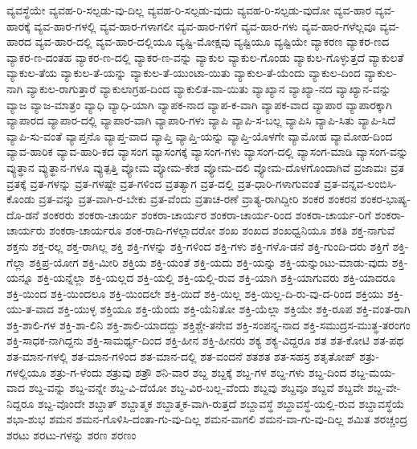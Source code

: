 {ವ್ಯವಸ್ಥೆಯೇ
ವ್ಯವಹ-ರಿ-ಸಲ್ಪಡು-ವು-ದಿಲ್ಲ
ವ್ಯವಹ-ರಿ-ಸಲ್ಪಡು-ವುದು
ವ್ಯವಹ-ರಿ-ಸಲ್ಪಡು-ವುದೋ
ವ್ಯವ-ಹಾರ
ವ್ಯವ-ಹಾರಕ್ಕೆ
ವ್ಯವ-ಹಾರ-ಗಳಲ್ಲಿ
ವ್ಯವ-ಹಾರ-ಗಳಾಗಲೀ
ವ್ಯವ-ಹಾರ-ಗಳಿಗೆ
ವ್ಯವ-ಹಾರ-ಗಳು
ವ್ಯವ-ಹಾರ-ಗಳೆಲ್ಲವೂ
ವ್ಯವ-ಹಾರದ
ವ್ಯವ-ಹಾರ-ದಲ್ಲಿ
ವ್ಯವ-ಹಾರ-ದಲ್ಲಿಯೂ
ವ್ಯಷ್ಟಿ-ಮೋಕ್ಷವು
ವ್ಯಷ್ಟಿಯೂ
ವ್ಯಷ್ಟಿಯೇ
ವ್ಯಾಕರಣ
ವ್ಯಾಕರ-ಣದ
ವ್ಯಾಕರ-ಣ-ದಂತಹ
ವ್ಯಾಕರ-ಣ-ದಲ್ಲಿ
ವ್ಯಾಕರ-ಣ-ವನ್ನು
ವ್ಯಾಕುಲ
ವ್ಯಾಕುಲ-ಗೊಂಡು
ವ್ಯಾಕುಲ-ಗೊಳ್ಳುತ್ತದೆ
ವ್ಯಾಕುಲತೆ
ವ್ಯಾಕುಲ-ತೆಯ
ವ್ಯಾಕುಲ-ತೆ-ಯನ್ನು
ವ್ಯಾಕುಲ-ತೆ-ಯುಂಟಾ-ಯಿತು
ವ್ಯಾಕುಲ-ತೆ-ಯೆಂದು
ವ್ಯಾಕುಲ-ದಿಂದ
ವ್ಯಾಕುಲ-ನಾಗಿ
ವ್ಯಾಕುಲ-ರಾಗುತ್ತಾರೆ
ವ್ಯಾಕುಲಾಗ್ರಹ-ದಿಂದ
ವ್ಯಾಕುಲಿತ-ವಾ-ಯಿತು
ವ್ಯಾಖ್ಯಾನ
ವ್ಯಾಖ್ಯಾ-ನದ
ವ್ಯಾಖ್ಯಾನ-ವನ್ನು
ವ್ಯಾಜ
ವ್ಯಾಜ-ಮಾತ್ರಂ
ವ್ಯಾಧಿ
ವ್ಯಾಧಿ-ಯಾಗಿ
ವ್ಯಾಪಕ-ನಾದ
ವ್ಯಾಪ-ಕ-ವಾಗಿ
ವ್ಯಾಪಕ-ವಾದ
ವ್ಯಾಪಾರ
ವ್ಯಾಪಾರಕ್ಕಾಗಿ
ವ್ಯಾಪಾರದ
ವ್ಯಾಪಾರ-ದಲ್ಲಿ
ವ್ಯಾಪಾರ-ವಾಗಿ
ವ್ಯಾಪಾರಿ-ಗಳು
ವ್ಯಾಪಿ
ವ್ಯಾಪಿ-ಸ-ಬಲ್ಲ
ವ್ಯಾಪಿಸಿ
ವ್ಯಾಪಿ-ಸಿತು
ವ್ಯಾಪಿ-ಸಿದೆ
ವ್ಯಾಪಿ-ಸು-ವಂತೆ
ವ್ಯಾಪ್ತನೊ
ವ್ಯಾಪ್ತ-ವಾದ
ವ್ಯಾಪ್ತಿ
ವ್ಯಾಪ್ತಿ-ಯನ್ನು
ವ್ಯಾಪ್ತಿ-ಯೊಳಗೇ
ವ್ಯಾಮೋಹ
ವ್ಯಾಮೋಹ-ದಿಂದ
ವ್ಯಾವ-ಹಾರಿಕ
ವ್ಯಾವ-ಹಾರಿ-ಕದ
ವ್ಯಾಸಂಗ
ವ್ಯಾಸಂಗಕ್ಕೆ
ವ್ಯಾಸಂಗ-ಗಳು
ವ್ಯಾಸಂಗ-ದಲ್ಲಿ
ವ್ಯಾಸಂಗ-ಮಾಡಿ
ವ್ಯಾಸಂಗ-ವನ್ನು
ವ್ಯುತ್ಥಾನ
ವ್ಯುತ್ಥಾನ-ಗಳೂ
ವ್ಯುತ್ಪತ್ತಿ
ವ್ಯೋಮ
ವ್ಯೋಮ-ಕೇಶ
ವ್ಯೋಮ-ದಲಿ
ವ್ಯೋಮ-ದೊಳಗೊಂದಾಗಿವೆ
ವ್ರಜಾಮಃ
ವ್ರತ
ವ್ರತಕ್ಕೆ
ವ್ರತ-ಗಳನ್ನು
ವ್ರತ-ಗಳಷ್ಟೇ
ವ್ರತ-ಗಳಿಂದ
ವ್ರತತ್ಯಾಗ
ವ್ರತ-ದಲ್ಲಿ
ವ್ರತ-ಧಾರಿ-ಗಳಾಗುವಂತೆ
ವ್ರತ-ವನ್ನವ-ಲಂಬಿಸಿ-ಕೊಂಡು
ವ್ರತ-ವನ್ನು
ವ್ರತ-ವಾಗಿ-ರ-ಬೇಕು
ವ್ರತ-ವೆಂದು
ವ್ರತಾಚ-ರಣೆ
ವ್ರಾತ್ಯ-ರಾಗಿದ್ದೀರಿ
ಶಂಕರ
ಶಂಕರನ
ಶಂಕರ-ಭಾಷ್ಯ-ದೊ-ಡನೆ
ಶಂಕರರು
ಶಂಕರಾ-ಚಾರ್ಯ
ಶಂಕರಾ-ಚಾರ್ಯರ
ಶಂಕರಾ-ಚಾರ್ಯ-ರಿಂದ
ಶಂಕರಾ-ಚಾರ್ಯ-ರಿಗೆ
ಶಂಕರಾ-ಚಾರ್ಯರು
ಶಂಕರಾ-ಚಾರ್ಯರೂ
ಶಂಕ-ರಾದಿ-ಗಳಲ್ಲಾದರೋ
ಶಂಖ
ಶಂಖದ
ಶಂಖಧ್ವನಿಯೂ
ಶಕತಿ
ಶಕ್ತ-ನಾಗುವೆ
ಶಕ್ತನು
ಶಕ್ತ-ರಲ್ಲ
ಶಕ್ತ-ರಾಗಿಲ್ಲ
ಶಕ್ತಿ
ಶಕ್ತಿ-ಗಳನ್ನು
ಶಕ್ತಿ-ಗಳಿಂದ
ಶಕ್ತಿ-ಗಳು
ಶಕ್ತಿ-ಗಳೊ-ಡನೆ
ಶಕ್ತಿ-ಗುಂದಿ-ದರು
ಶಕ್ತಿಗೆ
ಶಕ್ತಿ-ಗೆಲ್ಲಾ
ಶಕ್ತಿಪ್ರ-ಯೋಗ
ಶಕ್ತಿ-ಮೀರಿ
ಶಕ್ತಿಯ
ಶಕ್ತಿ-ಯಂತೆ
ಶಕ್ತಿ-ಯದು
ಶಕ್ತಿ-ಯನ್ನು
ಶಕ್ತಿ-ಯನ್ನುಂಟು-ಮಾಡು-ವುದು
ಶಕ್ತಿ-ಯನ್ನೂ
ಶಕ್ತಿ-ಯನ್ನೆಲ್ಲಾ
ಶಕ್ತಿ-ಯಲ್ಲದ
ಶಕ್ತಿ-ಯಲ್ಲಿ
ಶಕ್ತಿ-ಯಲ್ಲಿ-ರುವ
ಶಕ್ತಿ-ಯಾಗಿ
ಶಕ್ತಿ-ಯಾಗುವರು
ಶಕ್ತಿ-ಯಾದರೂ
ಶಕ್ತಿ-ಯಿಂದ
ಶಕ್ತಿ-ಯಿಂದಲೂ
ಶಕ್ತಿ-ಯಿಂದಲೇ
ಶಕ್ತಿ-ಯಿದೆ
ಶಕ್ತಿ-ಯಿಲ್ಲ
ಶಕ್ತಿ-ಯಿಲ್ಲ-ದಿ-ರು-ವು-ದ-ರಿಂದ
ಶಕ್ತಿಯು
ಶಕ್ತಿ-ಯು-ತ-ವಾದ
ಶಕ್ತಿ-ಯುಳ್ಳ
ಶಕ್ತಿಯೂ
ಶಕ್ತಿ-ಯೆಂದು
ಶಕ್ತಿ-ಯೆನಿತೋ
ಶಕ್ತಿ-ಯೆಲ್ಲಾ
ಶಕ್ತಿಯೇ
ಶಕ್ತಿ-ರೂಪ
ಶಕ್ತಿ-ವಂತ-ರಾಗಿ
ಶಕ್ತಿ-ಶಾಲಿ-ಗಳ
ಶಕ್ತಿ-ಶಾ-ಲಿನಿ
ಶಕ್ತಿ-ಶಾಲಿ-ಯಾದದ್ದು
ಶಕ್ತಿಶ್ಚೇ-ತನೇವ
ಶಕ್ತಿ-ಸಂಪನ್ನ-ನಾದ
ಶಕ್ತಿ-ಸಮುದ್ರಸ-ಮುತ್ಥ-ತರಂಗಂ
ಶಕ್ತಿ-ಸಾಧಕ-ನಾಗಿದ್ದನು
ಶಕ್ತಿ-ಸಾಮರ್ಥ್ಯ-ದಿಂದ
ಶಕ್ತಿ-ಹೀನ
ಶಕ್ತಿ-ಹೀನರು
ಶಕ್ಯ
ಶಕ್ಯ-ವಿದ್ದರೂ
ಶತ
ಶತ-ಕೋಟಿ
ಶತ-ಪಥ
ಶತ-ಮಾನ-ಗಳಲ್ಲಿ
ಶತ-ಮಾನ-ಗಳಿಂದ
ಶತ-ಮಾನ-ದಲ್ಲಿ
ಶತ-ವಂದನೆ
ಶತಶತ
ಶತ-ಸಹಸ್ರ
ಶತೃತೋಪ್
ಶತ್ರು-ಗಳಲ್ಲಿಯೂ
ಶತ್ರು-ಗ-ಳೆಂದು
ಶತ್ರುವು
ಶತ್ರೌ
ಶನಿ-ವಾರ
ಶಬ್ದ
ಶಬ್ದಕ್ಕೆ
ಶಬ್ದ-ಗಳ
ಶಬ್ದ-ಗಳು
ಶಬ್ದ-ದಿಂದ
ಶಬ್ದ-ಮಯ-ವಾದ
ಶಬ್ದ-ವನ್ನು
ಶಬ್ದ-ವನ್ನೇ
ಶಬ್ದ-ವಿ-ದೆಯೋ
ಶಬ್ದ-ವಿರ-ಬಲ್ಲ-ವೆಂದು
ಶಬ್ದವು
ಶಬ್ದವೂ
ಶಬ್ದವೆ
ಶಬ್ದವೇ
ಶಬ್ದ-ವೇ-ನಿದ್ದರೂ
ಶಬ್ದ-ವೊಂದೇ
ಶಬ್ದಾತ್
ಶಬ್ದಾತ್ಮಕ
ಶಬ್ದಾತ್ಮಕ-ವಾಗಿ-ರುತ್ತದೆ
ಶಬ್ದಾವಸ್ಥೆ
ಶಬ್ದಾವಸ್ಥೆ-ಯಲ್ಲಿ-ರುವ
ಶಬ್ದಾವಸ್ಥೆಯೆ
ಶಭಾ-ಶುಭ
ಶಮನ
ಶಮನ-ಗೊಳಿಸಿ-ದಂತಾ-ಗು-ವು-ದಿಲ್ಲ
ಶಮನ-ವಾಗಲಿ
ಶಮನ-ವಾ-ಗು-ವು-ದಿಲ್ಲ
ಶಮಿತ
ಶರಚ್ಚಂದ್ರ
ಶರಟು
ಶರಟು-ಗಳನ್ನು
ಶರಣ
ಶರಣಂ
}

